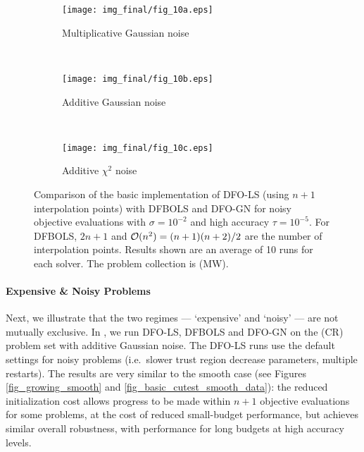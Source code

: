 \begin{figure}
	\centering
	\begin{subfigure}[b]{0.48\textwidth}
		\texttt{[image: img\_final/fig\_10a.eps]}
		\caption{Multiplicative Gaussian noise}
		\label{fig_basic_noise2_ubgsn_noisyf}
	\end{subfigure}
	~
	\begin{subfigure}[b]{0.48\textwidth}
		\texttt{[image: img\_final/fig\_10b.eps]}
		\caption{Additive Gaussian noise}
		\label{fig_basic_noise2_addgsn_noisyf}
	\end{subfigure}
	\\
	\begin{subfigure}[b]{0.48\textwidth}
		\texttt{[image: img\_final/fig\_10c.eps]}
		\caption{Additive $\chi^2$ noise}
		\label{fig_basic_noise2_addchisq_noisyf}
	\end{subfigure}
	\caption{Comparison of the basic implementation of DFO-LS (using $n+1$ interpolation points) with DFBOLS and DFO-GN for noisy objective evaluations with $\sigma=10^{-2}$ and high accuracy $\tau=10^{-5}$. For DFBOLS, $2n+1$ and $\mathcal{O}(n^2)=(n+1)(n+2)/2$ are the number of interpolation points. Results shown are an average of 10 runs for each solver. The problem collection is (MW).}
	\label{fig_basic_noise2}
\end{figure}

\paragraph{Expensive \& Noisy Problems}
Next, we illustrate that the two regimes --- `expensive' and `noisy' --- are not mutually exclusive.
In , we run DFO-LS, DFBOLS and DFO-GN on the (CR) problem set with additive Gaussian noise.
The DFO-LS runs use the default settings for noisy problems (i.e.~slower trust region decrease parameters, multiple restarts). The results are very similar to the smooth case (see Figures \ref{fig_growing_smooth} and \ref{fig_basic_cutest_smooth_data}): the reduced initialization cost allows progress to be made within $n+1$ objective evaluations for some problems, at the cost of reduced small-budget performance, but achieves similar overall robustness, with performance for long budgets at high accuracy levels.

